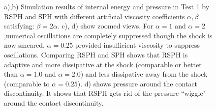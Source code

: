 \documentclass[review]{elsarticle}
\begin{document}
\begin{figure}[htp]
\begin{minipage}{.495\textwidth}
    \end{minipage}%
    \caption{
    a),b) Simulation results of internal energy and pressure in Test 1 by RSPH and SPH with different artificial viscosity coefficients $\alpha,\beta$ satisfying: $\beta=2\alpha$.  c), d) show zoomed views.  For $\alpha=1$ and $\alpha=2$,numerical oscillations are completely suppressed though the shock is now smeared. $\alpha=0.25$ provided insufficient viscosity to suppress oscillations. Comparing  RSPH and SPH shows that RSPH is adaptive and more dissipative at the shock 
    (comparable or better than $\alpha=1.0$ and $\alpha=2.0$) and less dissipative away from the shock (comparable to $\alpha=0.25$). d) shows pressure around the contact discontinuity. It shows that RSPH gets rid of the pressure ``wiggle" around the contact discontinuity.
%
}
    \label{fig:RCM-Sod-SPH-alf-zoom}
\end{figure}
\end{document}
